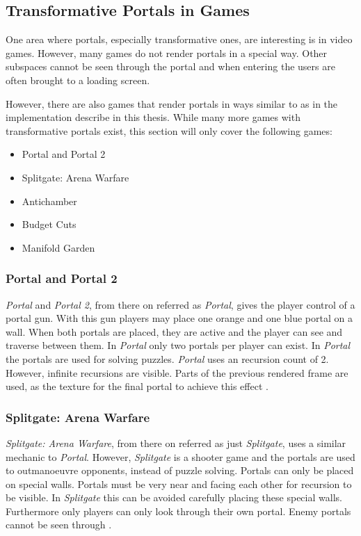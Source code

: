 \subsection{Transformative Portals in Games}
One area where portals, especially transformative ones, are interesting is in video games. However, many games do not render portals in a special way. Other subspaces cannot be seen through the portal and when entering the users are often brought to a loading screen. 

However, there are also games that render portals in ways similar to as in the implementation describe in this thesis. While many more games with transformative portals exist, this section will only cover the following games:
\begin{itemize}
	\item Portal and Portal 2
	\item Splitgate: Arena Warfare
	\item Antichamber
	\item Budget Cuts
	\item Manifold Garden
	
	
\end{itemize}

\subsubsection{Portal and Portal 2}
\textit{Portal} and \textit{Portal 2}, from there on referred as \textit{Portal}, gives the player control of a portal gun. With this gun players may place one orange and one blue portal on a wall. When both portals are placed, they are active and the player can see and traverse between them. In \textit{Portal} only two portals per player can exist. In \textit{Portal} the portals are used for solving puzzles. \textit{Portal} uses an recursion count of 2. However, infinite recursions are visible. Parts of the previous rendered frame are used, as the texture for the final portal to achieve this effect \cite{lecture:portalProblems}.

\subsubsection{Splitgate: Arena Warfare}
\textit{Splitgate: Arena Warfare}, from there on referred as just \textit{Splitgate}, uses a similar mechanic to \textit{Portal}. However, \textit{Splitgate} is a shooter game and the portals are used to outmanoeuvre opponents, instead of puzzle solving. Portals can only be placed on special walls. Portals must be very near and facing each other for recursion to be visible. In \textit{Splitgate} this can be avoided carefully placing these special walls. Furthermore only players can only look through their own portal. Enemy portals cannot be seen through \cite{splitgate}.

